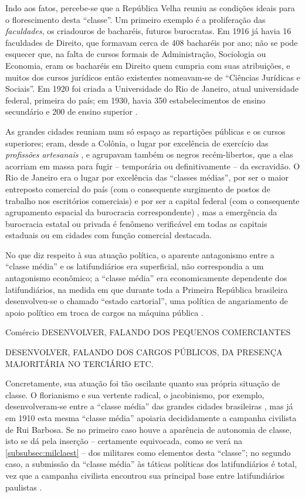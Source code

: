 Indo aos fatos, percebe-se que a República Velha reuniu as condições ideais para o florescimento desta ``classe''. Um primeiro exemplo é a proliferação das \textit{faculdades}, os criadouros de bacharéis, futuros burocratas. Em 1916 já havia 16 faculdades de Direito, que formavam cerca de 408 bacharéis por ano; não se pode esquecer que, na falta de cursos formais de Administração, Sociologia ou Economia, eram os bacharéis em Direito quem cumpria com suas atribuições, e muitos dos cursos jurídicos então existentes nomeavam-se de ``Ciências Jurídicas e Sociais''. Em 1920 foi criada a Universidade do Rio de Janeiro, atual universidade federal, primeira do país; em 1930, havia 350 estabelecimentos de ensino secundário e 200 de ensino superior \cite[p.~17]{pinheiro_clamed_1977}.

As grandes cidades reuniam num só espaço as repartições públicas e os cursos superiores; eram, desde a Colônia, o lugar por excelência de exercício das \textit{profissões artesanais} \cite{REIS2012}, e agrupavam também os negros recém-libertos, que a elas acorriam em massa para fugir -- temporária ou definitivamente -- da escravidão. O Rio de Janeiro era o lugar por excelência das ``classes médias'', por ser o maior entreposto comercial do país (com o consequente surgimento de postos de trabalho nos escritórios comerciais) e por ser a capital federal (com o consequente agrupamento espacial da burocracia correspondente) \cite[p.~119]{pinheiro_clamed_1977}, mas a emergência da burocracia estatal ou privada é fenômeno verificável em todas as capitais estaduais ou em cidades com função comercial destacada.

No que diz respeito à sua atuação política, o aparente antagonismo entre a ``classe média'' e os latifundiários era superficial, não correspondia a um antagonismo econômico; a ``classe média'' era economicamente dependente dos latifundiários, na medida em que durante toda a Primeira República brasileira desenvolveu-se o chamado ``estado cartorial'', uma política de angariamento de apoio político em troca de cargos na máquina pública \cite[p.~20]{pinheiro_clamed_1977}.

Comércio DESENVOLVER, FALANDO DOS PEQUENOS COMERCIANTES

 DESENVOLVER, FALANDO DOS CARGOS PÚBLICOS, DA PRESENÇA MAJORITÁRIA NO TERCIÁRIO ETC.

Concretamente, sua atuação foi tão oscilante quanto sua própria situação de classe. O florianismo e sua vertente radical, o jacobinismo, por exemplo, desenvolveram-se entre a ``classe média'' das grandes cidades brasileiras \cite{queiroz_radicais_1986}, mas já em 1910 esta mesma ``classe média'' apoiaria decididamente a campanha civilista de Rui Barbosa. Se no primeiro caso houve a aparência de autonomia de classe, isto se dá pela inserção -- certamente equivocada, como se verá na \autoref{subsubsec:milclaest} -- dos militares como elementos desta ``classe''; no segundo caso, a submissão da ``classe média'' às táticas políticas dos latifundiários é total, vez que a campanha civilista encontrou sua principal base entre latifundiários paulistas \cite[p.~28-29]{pinheiro_clamed_1977}.


